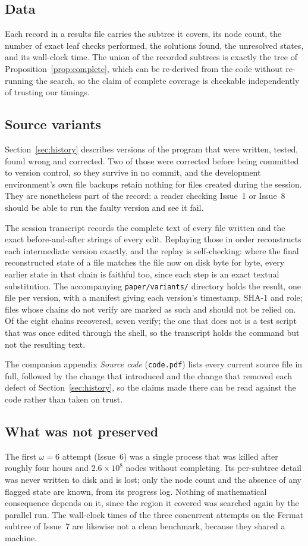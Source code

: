 \documentclass[11pt]{amsart}
\theoremstyle{remark}
\begin{document}
\subsection{Data}
Each record in a results file carries the subtree it covers, its node count,
the number of exact leaf checks performed, the solutions found, the unresolved
states, and its wall-clock time. The union of the recorded subtrees is exactly
the tree of Proposition~\ref{prop:complete}, which can be re-derived from the
code without re-running the search, so the claim of complete coverage is
checkable independently of trusting our timings.

\subsection{Source variants}\label{sec:variants}
Section~\ref{sec:history} describes versions of the program that were written,
tested, found wrong and corrected. Two of those were corrected before being
committed to version control, so they survive in no commit, and the development
environment's own file backups retain nothing for files created during the
session. They are nonetheless part of the record: a reader checking Issue~1 or
Issue~8 should be able to run the faulty version and see it fail.

The session transcript records the complete text of every file written and the
exact before-and-after strings of every edit. Replaying those in order
reconstructs each intermediate version exactly, and the replay is self-checking:
where the final reconstructed state of a file matches the file now on disk byte
for byte, every earlier state in that chain is faithful too, since each step is
an exact textual substitution. The accompanying
\texttt{paper/variants/} directory holds the result, one file per version, with
a manifest giving each version's timestamp, SHA-1 and role; files whose chains
do not verify are marked as such and should not be relied on. Of the eight
chains recovered, seven verify; the one that does not is a test script that was
once edited through the shell, so the transcript holds the command but not the
resulting text.

The companion appendix \emph{Source code} (\texttt{code.pdf}) lists every
current source file in full, followed by the change that introduced and the
change that removed each defect of Section~\ref{sec:history}, so the claims made
there can be read against the code rather than taken on trust.

\subsection{What was not preserved}
The first $\omega = 6$ attempt (Issue~6) was a single process that was killed
after roughly four hours and $2.6 \times 10^{8}$ nodes without completing. Its
per-subtree detail was never written to disk and is lost; only the node count
and the absence of any flagged state are known, from its progress log. Nothing
of mathematical consequence depends on it, since the region it covered was
searched again by the parallel run. The wall-clock times of the three concurrent
attempts on the Fermat subtree of Issue~7 are likewise not a clean benchmark,
because they shared a machine.
\end{document}
